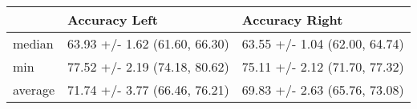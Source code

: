 \begin{tabular}{lll}
\toprule
{} &                  Accuracy Left &                 Accuracy Right \\
\midrule
median  &  63.93 +/- 1.62 (61.60, 66.30) &  63.55 +/- 1.04 (62.00, 64.74) \\
min     &  77.52 +/- 2.19 (74.18, 80.62) &  75.11 +/- 2.12 (71.70, 77.32) \\
average &  71.74 +/- 3.77 (66.46, 76.21) &  69.83 +/- 2.63 (65.76, 73.08) \\
\bottomrule
\end{tabular}
